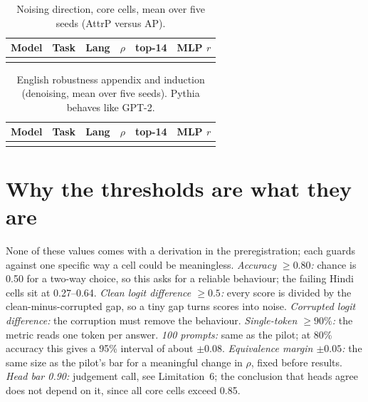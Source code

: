 \documentclass[10pt,a4paper]{article}
\begin{document}
\begin{table}[h]
\centering\small
\begin{tabular}{@{}lllccc@{}}
\toprule
Model & Task & Lang & $\rho$ & top-14 & MLP $r$\\
\midrule
\\
\bottomrule
\end{tabular}
\caption{Noising direction, core cells, mean over five seeds (AttrP versus AP).}
\label{tab:noise}
\end{table}

\begin{table}[h]
\centering\small
\begin{tabular}{@{}lllccc@{}}
\toprule
Model & Task & Lang & $\rho$ & top-14 & MLP $r$\\
\midrule
\\
\bottomrule
\end{tabular}
\caption{English robustness appendix and induction (denoising, mean over five seeds). Pythia behaves like GPT-2.}
\label{tab:robust}
\end{table}

\section{Why the thresholds are what they are}
None of these values comes with a derivation in the preregistration; each guards against one specific way a cell could be meaningless. \emph{Accuracy $\ge0.80$:} chance is 0.50 for a two-way choice, so this asks for a reliable behaviour; the failing Hindi cells sit at 0.27--0.64. \emph{Clean logit difference $\ge0.5$:} every score is divided by the clean-minus-corrupted gap, so a tiny gap turns scores into noise. \emph{Corrupted logit difference:} the corruption must remove the behaviour. \emph{Single-token $\ge90\%$:} the metric reads one token per answer. \emph{100 prompts:} same as the pilot; at 80\% accuracy this gives a 95\% interval of about $\pm0.08$. \emph{Equivalence margin $\pm0.05$:} the same size as the pilot's bar for a meaningful change in $\rho$, fixed before results. \emph{Head bar 0.90:} judgement call, see Limitation~6; the conclusion that heads agree does not depend on it, since all core cells exceed 0.85.
\end{document}
